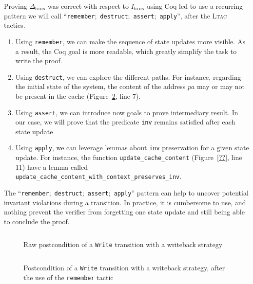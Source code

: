 \documentclass[oneside,a4paper]{memoir}
\theoremstyle{break}
\begin{document}
Proving \( \Delta_{\mathtt{bios}} \) was correct with respect to
\( I_{\mathtt{bios}} \) using Coq led to use a recurring pattern we will call
``\texttt{remember};~\texttt{destruct};~\texttt{assert};~\texttt{apply}'', after
the {\scshape Ltac} tactics.
%
\begin{enumerate}
\item Using \texttt{remember}, we can make the sequence of state updates more
  visible. As a result, the Coq goal is more readable, which greatly simplify
  the task to write the proof.
\item Using \texttt{destruct}, we can explore the different paths. For instance,
  regarding the initial state of the system, the content of the address \( pa \)
  may or may not be present in the cache
  (Figure~\ref{fig:freespec:rememberpost}, line 7).
\item Using \texttt{assert}, we can introduce now goals to prove intermediary
  result. In our case, we will prove that the predicate \texttt{inv} remains
  satisfied after each state update
\item Using \texttt{apply}, we can leverage lemmas about \texttt{inv}
  preservation for a given state update. For instance, the function
  \texttt{update\_cache\_content} (Figure~\ref{??}, line 11) have a lemma called
  \texttt{update\_cache\_content\_with\_context\_preserves\_inv}.
\end{enumerate}

The ``\texttt{remember};~\texttt{destruct};~\texttt{assert};~\texttt{apply}''
pattern can help to uncover potential invariant violations during a transition.
%
In practice, it is cumbersome to use, and nothing prevent the verifier from
forgetting one state update and still being able to conclude the proof.

\begin{figure}
  \inputminted{coq}{Listings/StateHell.v}

  \caption{Raw postcondition of a \texttt{Write} transition with a writeback
    strategy}
  \label{fig:freespec:postcondition}
\end{figure}


\begin{figure}
  \inputminted{coq}{Listings/RememberPattern.v}

  \caption{Postcondition of a \texttt{Write} transition with a writeback
    strategy, after the use of the \texttt{remember} tactic}
  \label{fig:freespec:rememberpost}
\end{figure}

%

\end{document}
